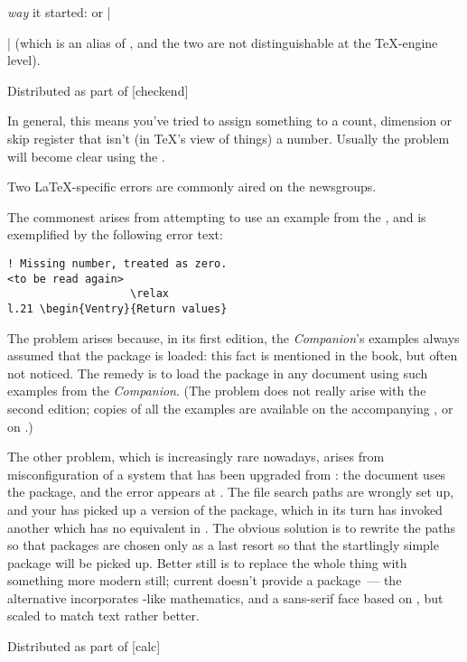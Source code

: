 \emph{way} it started:  or |{| (which is an alias of
, and the two are not  distinguishable at the \TeX{}-engine
level).
\begin{ctanrefs}
\item[checkend.sty]Distributed as part of [checkend]
\end{ctanrefs}


In general, this means you've tried to assign something to a count,
dimension or skip register that isn't (in \TeX{}'s view of things) a
number.  Usually the problem will become clear using the
.

Two \LaTeX{}-specific errors are commonly aired on the newsgroups.

The commonest arises from attempting to use an example from the
, and is
exemplified by the following error text:
\begin{verbatim}
! Missing number, treated as zero.
<to be read again> 
                   \relax 
l.21 \begin{Ventry}{Return values}
\end{verbatim}
The problem arises because, in its first edition, the
\emph{Companion}'s examples always assumed that the 
package is loaded: this fact is mentioned in the book, but often not
noticed.  The remedy is to load the  package in any
document using such examples from the \emph{Companion}.  (The problem
does not really arise with the second edition; copies of all the
examples are available on the accompanying \CDROM{}, or on
.)

The other problem, which is increasingly rare nowadays, arises from
misconfiguration of a system that has been upgraded from \LaTeXo{}:
the document uses the  package, and the error appears
at .  The file search paths are wrongly set
up, and your  has picked up a \LaTeXo{}
version of the package, which in its turn has invoked another which
has no equivalent in \LaTeXe{}.  The obvious solution is to rewrite
the paths so that \LaTeXo{} packages are chosen only as a last resort
so that the startlingly simple \LaTeXe{}  package will
be picked up.  Better still is to replace the whole thing with
something more modern still; current  doesn't provide
a  package~--- the alternative 
incorporates -like mathematics, and a sans-serif face
based on , but scaled to match 
text rather better.
\begin{ctanrefs}
\item[calc.sty]Distributed as part of [calc]
\item[\nothtml{\rmfamily}Examples for \nothtml{\upshape}\LaTeX{} Companion]
\item[The psnfss bundle]
\end{ctanrefs}

}
